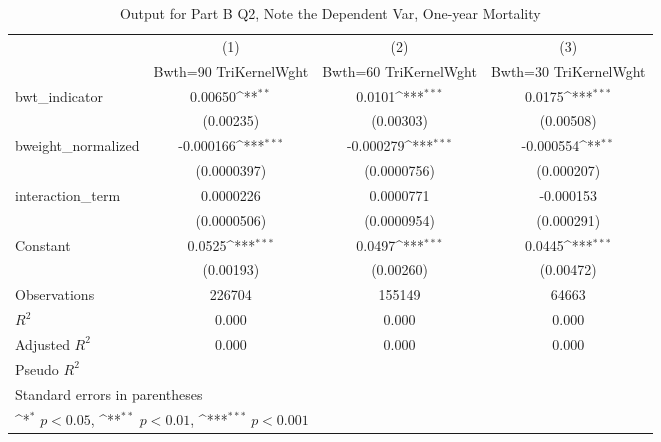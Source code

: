 \documentclass{article}
\begin{document}
\begin{table}[H]\centering
\def\sym#1{\ifmmode^{#1}\else\(^{#1}\)\fi}
\caption{Output for Part B Q2, Note the Dependent Var, One-year Mortality \label{bq2}}
\begin{tabular}{l*{3}{c}}
\toprule
                    &\multicolumn{1}{c}{(1)}&\multicolumn{1}{c}{(2)}&\multicolumn{1}{c}{(3)}\\
                    &\multicolumn{1}{c}{Bwth=90 TriKernelWght}&\multicolumn{1}{c}{Bwth=60 TriKernelWght}&\multicolumn{1}{c}{Bwth=30 TriKernelWght}\\
\midrule
bwt\_indicator       &     0.00650\sym{**} &      0.0101\sym{***}&      0.0175\sym{***}\\
                    &   (0.00235)         &   (0.00303)         &   (0.00508)         \\
\addlinespace
bweight\_normalized  &   -0.000166\sym{***}&   -0.000279\sym{***}&   -0.000554\sym{**} \\
                    & (0.0000397)         & (0.0000756)         &  (0.000207)         \\
\addlinespace
interaction\_term    &   0.0000226         &   0.0000771         &   -0.000153         \\
                    & (0.0000506)         & (0.0000954)         &  (0.000291)         \\
\addlinespace
Constant            &      0.0525\sym{***}&      0.0497\sym{***}&      0.0445\sym{***}\\
                    &   (0.00193)         &   (0.00260)         &   (0.00472)         \\
\midrule
Observations        &      226704         &      155149         &       64663         \\
\(R^{2}\)           &       0.000         &       0.000         &       0.000         \\
Adjusted \(R^{2}\)  &       0.000         &       0.000         &       0.000         \\
Pseudo \(R^{2}\)    &                     &                     &                     \\
\bottomrule
\multicolumn{4}{l}{\footnotesize Standard errors in parentheses}\\
\multicolumn{4}{l}{\footnotesize \sym{*} \(p<0.05\), \sym{**} \(p<0.01\), \sym{***} \(p<0.001\)}\\
\end{tabular}
\end{table}
\end{document}
